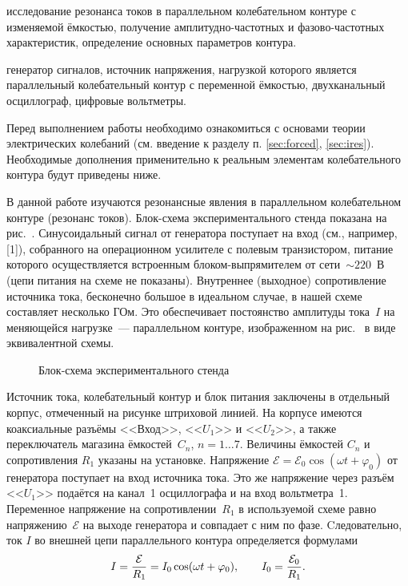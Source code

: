 
\begin{lab:aim}
	исследование резонанса токов в параллельном колебательном контуре с
изменяемой ёмкостью, получение амплитудно-частотных и
фазово-частотных характеристик, определение основных параметров контура.
\end{lab:aim}

\begin{lab:equipment}
	генератор сигналов, источник напряжения, нагрузкой которого является
параллельный колебательный контур с переменной ёмкостью, двухканальный
осциллограф, цифровые вольтметры.
\end{lab:equipment}

Перед выполнением работы необходимо ознакомиться с основами теории электрических  
колебаний (см. введение к разделу п. \ref{sec:forced}, \ref{sec:ires}).
Необходимые дополнения применительно к реальным элементам колебательного
контура будут приведены ниже.

\experiment
В данной работе изучаются резонансные явления в параллельном колебательном
контуре (резонанс токов). Блок-схема экспериментального стенда 
показана на рис.~. Синусоидальный сигнал
от генератора поступает на вход  (см., например, [1]), собранного на операционном усилителе с полевым
транзистором, питание которого осуществляется встроенным блоком-выпрямителем от
сети~$\sim220$~В (цепи питания на схеме не показаны).  Внутреннее (выходное)
сопротивление источника тока, бесконечно большое в идеальном случае, в нашей
схеме составляет несколько ГОм. Это обеспечивает постоянство амплитуды тока~$I$
на меняющейся нагрузке~--- параллельном контуре, изображенном на 
рис.~ в виде эквивалентной схемы.

\begin{figure}[h!]
    \centering
	\caption{Блок-схема экспериментального стенда}
\end{figure}


Источник тока, колебательный контур и блок питания заключены в отдельный корпус,
отмеченный на рисунке штриховой линией. 
На корпусе имеются коаксиальные разъёмы <<Вход>>,
<<${U}_1$>> и <<${U}_2$>>, а также переключатель магазина ёмкостей~$C_n$,
$n=1\ldots7$. Величины ёмкостей $C_n$ и сопротивления $R_1$ указаны на установке.
Напряжение $\mathcal{E}=\mathcal{E}_0\cos(\omega t+\varphi_0)$ от генератора поступает на
вход источника тока. Это же напряжение через разъём <<${U}_1$>> подаётся на
канал~1 осциллографа и на вход вольтметра~1. Переменное напряжение на
сопротивлении~$R_1$ в используемой схеме равно напряжению~$\mathcal{E}$ 
на выходе генератора и совпадает с ним по фазе. 
Cледовательно, ток $I$ во внешней цепи параллельного контура 
определяется формулами
\begin{equation}\eqmark{2.3.1}
	I=\frac{\mathcal{E}}{R_1}=I_0\cos(\omega t+\varphi_0), \qquad 
    I_0=\frac{\mathcal{E}_0}{R_1}.
\end{equation}

